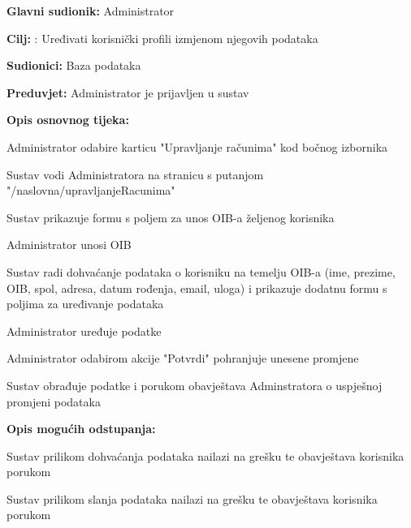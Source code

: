 											
				\noindent {}
				\begin{packed_item}
					
					\item \textbf{Glavni sudionik: }Administrator
					\item  \textbf{Cilj:} : Uređivati korisnički profili izmjenom njegovih podataka
					\item  \textbf{Sudionici:} Baza podataka
					\item  \textbf{Preduvjet:} Administrator je prijavljen u sustav
					\item  \textbf{Opis osnovnog tijeka:}
					
					\item[] \begin{packed_enum}						
						\item Administrator odabire karticu "Upravljanje računima" kod bočnog izbornika
						\item Sustav vodi Administratora na stranicu s putanjom "/naslovna/upravljanjeRacunima"
						\item Sustav prikazuje formu s poljem za unos OIB-a željenog korisnika
						\item Administrator unosi OIB
						\item Sustav radi dohvaćanje podataka o korisniku na temelju OIB-a (ime, prezime, OIB, spol, adresa, datum rođenja, email, uloga) i prikazuje dodatnu formu s poljima za uređivanje podataka
						\item Administrator uređuje podatke
						\item Administrator odabirom akcije "Potvrdi" pohranjuje unesene promjene 
						\item Sustav obrađuje podatke i porukom obavještava Adminstratora o uspješnoj promjeni podataka
						\end{packed_enum}	
					
					\item  \textbf{Opis mogućih odstupanja:}
					
					\item[] \begin{packed_item}
						\item[5.a] Sustav prilikom dohvaćanja podataka nailazi na grešku te obavještava korisnika porukom
						\item[8.a] Sustav prilikom slanja podataka nailazi na grešku te obavještava korisnika porukom
					\end{packed_item}
					
				\end{packed_item}	
				
